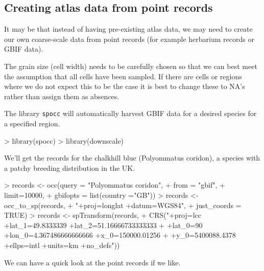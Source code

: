 \documentclass{article}[12pt, a4paper]
\begin{document}
\subsection{Creating atlas data from point records}

It may be that instead of having pre-existing atlas data, we may need to create our own coarse-scale data from point records (for example herbarium records or GBIF data).

The grain size (cell width) needs to be carefully chosen so that we can best meet the assumption that all cells have been sampled. If there are cells or regions where we do not expect this to be the case it is best to change these to NA’s rather than assign them as absences.

The library \texttt{spocc} will automatically harvest GBIF data for a desired species for a specified region.

\begin{Schunk}
\begin{Sinput}
> library(spocc)
> library(downscale)
\end{Sinput}
\end{Schunk}

We’ll get the records for the chalkhill blue (Polyommatus coridon), a species with a patchy breeding distribution in the UK.

\begin{Schunk}
\begin{Sinput}
> records <- occ(query = "Polyommatus coridon",
+                from = "gbif",
+                limit=10000,
+                gbifopts = list(country ="GB"))
> records <- occ_to_sp(records,
+                      "+proj=longlat +datum=WGS84",
+                      just_coords = TRUE)
> records <- spTransform(records,
+                        CRS("+proj=lcc +lat_1=49.8333339 +lat_2=51.16666733333333
+                            +lat_0=90 +lon_0=4.367486666666666 +x_0=150000.01256 
+                            +y_0=5400088.4378 +ellps=intl +units=km +no_defs"))
\end{Sinput}
\end{Schunk}

We can have a quick look at the point records if we like.
\end{document}

